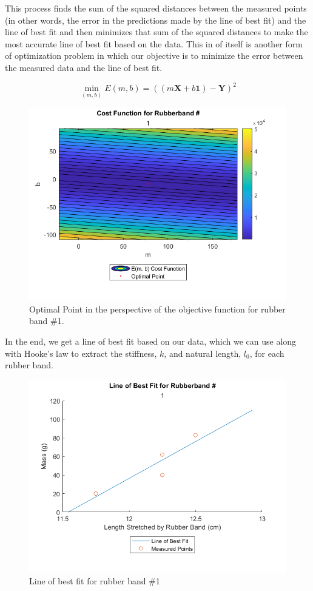 \documentclass[10pt,letterpaper,onecolumn,report]{tau-class/tau}
\begin{document}
        This process finds the sum of the squared distances between the measured points (in other words, the error in the predictions made by the line of best fit) and the line of best fit and then minimizes that sum of the squared distances to make the most accurate line of best fit based on the data. This in of itself is another form of optimization problem in which our objective is to minimize the error between the measured data and the line of best fit.

        \begin{equation}
            \min_{(m, b)}E(m, b) = ((m\textbf{X}+b\textbf{1})-\textbf{Y})^2
        \end{equation}
        
        \begin{figure}[H]
            \centering
            \setcounter{figure}{1} %
            \includegraphics[width=0.5\linewidth]{figures/figure 2; cost function rubber band 1.png}
            \caption{Optimal Point in the perspective of the objective function for rubber band \#1.}
            \label{fig:enter-label}
        \end{figure}
        
        In the end, we get a line of best fit based on our data, which we can use along with Hooke’s law to extract the stiffness, \(k\), and natural length, \(l_0\), for each rubber band.

        \begin{figure}[H]
            \centering
            \setcounter{figure}{0} %
            \includegraphics[width=0.5\linewidth]{figures/figure 1; line of best fit rubber band 1.png}
            \caption{Line of best fit for rubber band \#1}
            \label{fig:enter-label}
        \end{figure}
\end{document}
